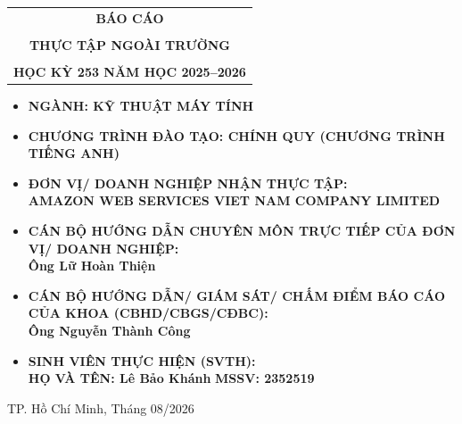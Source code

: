 \documentclass[a4paper]{article}
\theoremstyle{definition}
\begin{document}
\begin{titlepage}
\begin{center}
\begin{tabular}{c}
\multicolumn{1}{c}{\textbf{{\LARGE BÁO CÁO}}}\\
\\{\textbf{{\LARGE THỰC TẬP NGOÀI TRƯỜNG}}}
\\
\\
\textbf{\Large HỌC KỲ 253 NĂM HỌC 2025--2026} \\
\end{tabular}
\end{center}
\vspace{0.2cm}
\begin{itemize}
\renewcommand\labelitemi{--}
    \item \Large \textbf{NGÀNH: KỸ THUẬT MÁY TÍNH}
    \item \Large \textbf{CHƯƠNG TRÌNH ĐÀO TẠO: CHÍNH QUY (CHƯƠNG TRÌNH TIẾNG ANH)}
\end{itemize}
\vspace{0.3cm}
\begin{itemize}
\renewcommand\labelitemi{--}
    \item \Large \textbf{ĐƠN VỊ/ DOANH NGHIỆP NHẬN THỰC TẬP:}
    \\ \Large \textbf{AMAZON WEB SERVICES VIET NAM COMPANY LIMITED}
    \item \Large \textbf{CÁN BỘ HƯỚNG DẪN CHUYÊN MÔN TRỰC TIẾP CỦA ĐƠN VỊ/ DOANH NGHIỆP:}
    \\ \Large \textbf{Ông Lữ Hoàn Thiện}
    \item \Large \textbf{CÁN BỘ HƯỚNG DẪN/ GIÁM SÁT/ CHẤM ĐIỂM BÁO CÁO CỦA KHOA (CBHD/CBGS/CĐBC):}
    \\ \Large \textbf{Ông Nguyễn Thành Công}
    \item \Large \textbf{SINH VIÊN THỰC HIỆN (SVTH):}
    \\[0.3cm]
    {\Large
    \textbf{HỌ VÀ TÊN: Lê Bảo Khánh}
    \hspace{1cm}
    \textbf{MSSV: 2352519}
    }
\end{itemize}
\vspace{0.2cm}
\begin{center}
{\Large TP. Hồ Chí Minh, Tháng 08/2026}
\end{center}
\end{titlepage}

\newpage
\tableofcontents
\newpage




\end{document}

